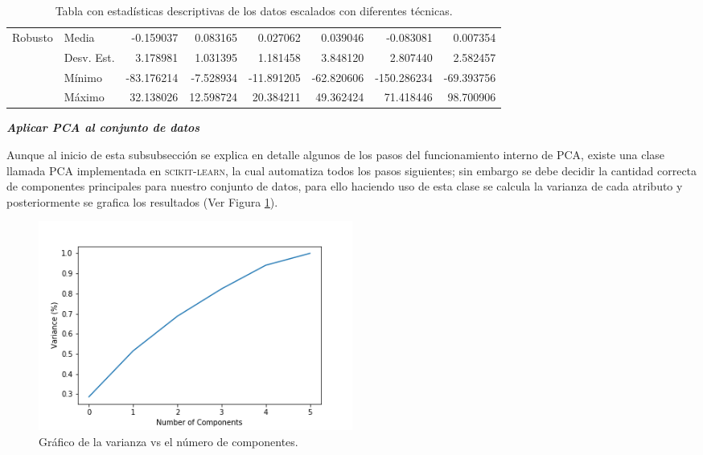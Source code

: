 \begin{landscape}
\begin{table}[p!]
\begin{tabular}{ll|r|r|r|r|r|r|}
\multicolumn{1}{|l|}{\multirow{4}{*}{Robusto}} & Media & -0.159037 & 0.083165 & 0.027062 & 0.039046 & -0.083081 & 0.007354 \\ \cline{2-8} 
\multicolumn{1}{|l|}{}                  & Desv. Est. & 3.178981 & 1.031395 & 1.181458 & 3.848120 & 2.807440 & 2.582457 \\\cline{2-8} 
\multicolumn{1}{|l|}{}                  & M\'{i}nimo & -83.176214 & -7.528934	& -11.891205 & -62.820606 & -150.286234 & -69.393756 \\ \cline{2-8} 
\multicolumn{1}{|l|}{}                  & M\'{a}ximo & 32.138026 & 12.598724 & 20.384211 & 49.362424 & 71.418446 & 98.700906 \\ \hline
\end{tabular}
\caption{Tabla con estad\'{i}sticas descriptivas de los datos escalados con diferentes t\'{e}cnicas.}
\label{table:scalers}
\end{table}
\end{landscape}


\pagestyle{thesis}

\vspace{5mm} %

\textbf{\textit{Aplicar PCA al conjunto de datos}}

\vspace{5mm} %

Aunque al inicio de esta subsubsecci\'{o}n se explica en detalle algunos de los pasos del funcionamiento interno de PCA, existe una clase llamada PCA implementada en \textsc{scikit-learn}, la cual automatiza todos los pasos siguientes; sin embargo se debe decidir la cantidad correcta de componentes principales para nuestro conjunto de datos, para ello haciendo uso de esta clase se calcula la varianza de cada atributo y posteriormente se grafica los resultados (Ver Figura \ref{fig:varianza-pca}).

\begin{figure}[h!]
  \begin{center}	\includegraphics[width=0.5\textwidth]{imagenes/Cap3/pca}
  \caption{Gr\'{a}fico de la varianza vs el n\'{u}mero de componentes.}
  \label{fig:varianza-pca}
  \end{center}
\end{figure}

